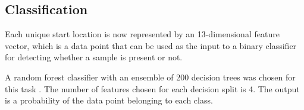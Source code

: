 \documentclass{article}
\begin{document}




\subsection{Classification}
\label{class}
Each unique start location is now represented by an 13-dimensional feature vector, which is a data point that can be used as the input to a binary classifier for detecting whether a sample is present or not.

A random forest classifier with an ensemble of 200 decision trees was chosen for this task \cite{breiman2001random}. The number of features chosen for each decision split is 4. The output is a probability of the data point belonging to each class.
\end{document}
